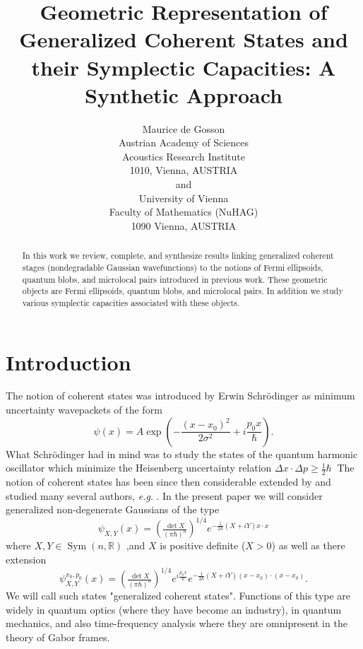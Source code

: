 \documentclass[11pt]{article}%
\begin{document}
\title{Geometric Representation of Generalized Coherent States and their Symplectic
Capacities: A Synthetic Approach}
\author{Maurice de Gosson\\Austrian Academy of Sciences\\Acoustics Research Institute\\1010, Vienna, AUSTRIA\\and\\University of Vienna\\Faculty of Mathematics (NuHAG)\\1090 Vienna, AUSTRIA}
\maketitle

\begin{abstract}
In this work we review, complete, and synthesize results linking generalized
coherent stages (nondegradable Gaussian wavefunctions) to the notions of Fermi
ellipsoids, quantum blobs, and microlocal pairs introduced in previous work.
These geometric objects are Fermi ellipsoids, quantum blobs, and microlocal
pairs. In addition we study various symplectic capacities associated with
these objects.

\end{abstract}

\section{Introduction}

The notion of coherent states was introduced by Erwin Schr\"{o}dinger
\cite{Schr1} as minimum uncertainty wavepackets of the form
\begin{equation}
\psi(x)=A\exp\left(  -\frac{(x-x_{0})^{2}}{2\sigma^{2}}+i\frac{p_{0}x}{\hbar
}\right)  . \label{coh1}%
\end{equation}
What Schr\"{o}dinger had in mind was to study the states of the quantum
harmonic oscillator which minimize the Heisenberg uncertainty relation $\Delta
x\cdot\Delta p\geq\frac{1}{2}\hbar\ $ The notion of coherent states has been
since then considerable extended by and studied many several authors,\textit{
e.g}. \cite{1,2,3}. In the present paper we will consider generalized
non-degenerate Gaussians of the type
\begin{equation}
\psi_{X,Y}(x)=\left(  \tfrac{\det X}{(\pi\hbar)^{n}}\right)  ^{1/4}%
e^{-\frac{1}{2\hbar}(X+iY)x\cdot x} \label{coh2}%
\end{equation}
where $X,Y\in\operatorname*{Sym}(n,\mathbb{R})$ ,and $X$ is positive definite
($X>0$) as well as there extension
\begin{equation}
\psi_{X,Y}^{x_{0},p_{0}}(x)=\left(  \tfrac{\det X}{(\pi\hbar)^{n}}\right)
^{1/4}e^{i\frac{p_{0}x}{\hbar}}e^{-\frac{1}{2\hbar}(X+iY)(x-x_{0}%
)\cdot(x-x_{0})}. \label{coh3}%
\end{equation}
We will call such states "generalized coherent states". Functions of this type
are widely in quantum optics (where they have become an industry), in quantum
mechanics, and also time-frequency analysis where they are omnipresent in the
theory of Gabor frames.
\end{document}
